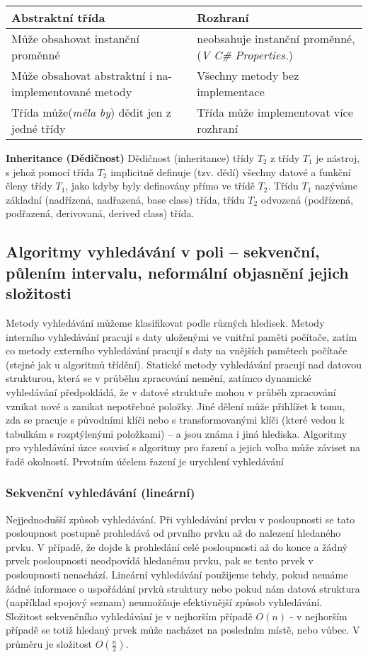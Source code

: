 \begin{table}[h!]
\begin{tabular}{l | l}
\hline
\textbf{Abstraktní třída} & \textbf{Rozhraní} \\
\hline
Může obsahovat instanční proměnné & neobsahuje instanční proměnné, (\textit{V C\# Properties.}) \\
Může obsahovat abstraktní i na-implementované metody & Všechny metody bez implementace \\
Třída může(\textit{měla by}) dědit jen z jedné třídy & Třída může implementovat více rozhraní\\
\hline
\end{tabular}
\end{table}
\textbf{Inheritance (Dědičnost)} Dědičnost (inheritance) třídy $T_2$ z třídy $T_1$ je nástroj, s jehož pomocí třída $T_2$ implicitně definuje (tzv. dědí) všechny datové a funkční členy třídy $T_1$, jako kdyby byly definovány přímo ve třídě $T_2$. Třídu $T_1$ nazýváme základní (nadřízená, nadřazená, base class) třída, třídu $T_2$ odvozená (podřízená, podřazená, derivovaná, derived class) třída.

\subsection[Algoritmy vyhledávání]{Algoritmy vyhledávání v poli – sekvenční, půlením intervalu, neformální objasnění jejich složitosti}
Metody vyhledávání můžeme klasifikovat podle různých hledisek. Metody interního vyhledávání pracují s daty uloženými ve vnitřní paměti počítače, zatím co metody externího vyhledávání pracují s daty na vnějších pamětech počítače (stejné jak u algoritmů třídění).  Statické metody vyhledávání pracují nad datovou strukturou, která se v průběhu zpracování nemění, zatímco dynamické vyhledávání předpokládá, že v datové struktuře mohou v průběh zpracování vznikat nové a zanikat nepotřebné položky.  Jiné dělení může přihlížet k tomu, zda se pracuje s původními klíči nebo s transformovanými klíči (které vedou k tabulkám s rozptýlenými položkami) – a jsou známa i jiná hlediska. Algoritmy pro vyhledávání úzce souvisí s algoritmy pro řazení a jejich volba může záviset na řadě okolností. Prvotním účelem řazení je urychlení vyhledávání

\subsubsection{Sekvenční vyhledávání (lineární)}
Nejjednodušší způsob vyhledávání. Při vyhledávání prvku v posloupnosti se tato posloupnost postupně prohledává od prvního prvku až do nalezení hledaného prvku. V případě, že dojde k prohledání celé posloupnosti až do konce a žádný prvek posloupnosti neodpovídá hledanému prvku, pak se tento prvek v posloupnosti nenachází. Lineární vyhledávání použijeme tehdy, pokud nemáme žádné informace o uspořádání prvků struktury nebo pokud nám datová struktura (například spojový seznam) neumožňuje efektivnější způsob vyhledávání.
Složitost sekvenčního vyhledávání je v nejhorším případě $O(n)$ - v nejhorším případě se totiž hledaný prvek může nacházet na posledním místě, nebo vůbec. V průměru je složitost $O(\frac{n}{2})$.
